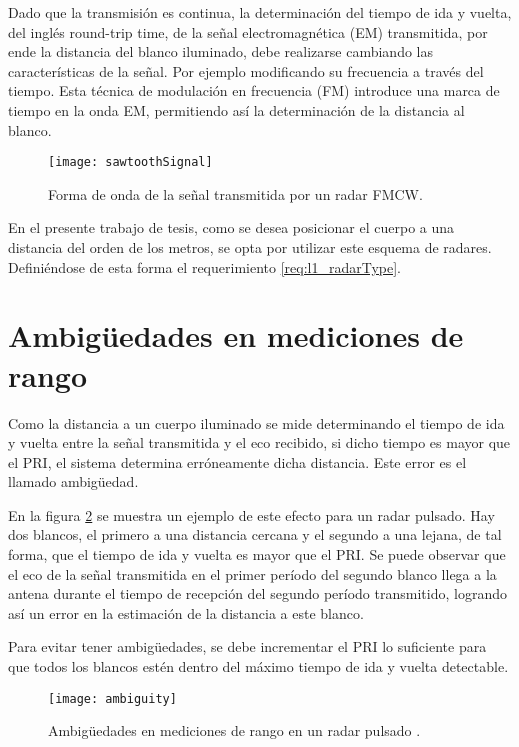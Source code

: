 Dado que la transmisión es continua, la determinación del tiempo de ida y vuelta, del inglés round-trip time, de la señal electromagnética (EM) transmitida, por ende la distancia del blanco iluminado, debe realizarse cambiando las características de la señal. Por ejemplo modificando su frecuencia a través del tiempo. Esta técnica de modulación en frecuencia (FM) introduce una marca de tiempo en la onda EM, permitiendo así la determinación de la distancia al blanco.

\begin{figure}[H]
 \centering
 \texttt{[image: sawtoothSignal]}
 \caption{Forma de onda de la señal transmitida por un radar FMCW.}
 \label{fig:continuousWaveform}
\end{figure}

En el presente trabajo de tesis, como se desea posicionar el cuerpo a una distancia del orden de los metros, se opta por utilizar este esquema de radares. Definiéndose de esta forma el requerimiento \ref{req:l1_radarType}.


\section{Ambigüedades en mediciones de rango} \label{sc:ambiguity}

Como la distancia a un cuerpo iluminado se mide determinando el tiempo de ida y vuelta entre la señal transmitida y el eco recibido, si dicho tiempo es mayor que el PRI, el sistema determina erróneamente dicha distancia. Este error es el llamado ambigüedad.

En la figura \ref{fig:ambiguity} se muestra un ejemplo de este efecto para un radar pulsado. Hay dos blancos, el primero a una distancia cercana y el segundo a una lejana, de tal forma, que el tiempo de ida y vuelta es mayor que el PRI. Se puede observar que el eco de la señal transmitida en el primer período del segundo blanco llega a la antena durante el tiempo de recepción del segundo período transmitido, logrando así un error en la estimación de la distancia a este blanco.

Para evitar tener ambigüedades, se debe incrementar el PRI lo suficiente para que todos los blancos estén dentro del máximo tiempo de ida y vuelta detectable.

\begin{figure}[H]
 \centering
 \texttt{[image: ambiguity]}
 \caption{Ambigüedades en mediciones de rango en un radar pulsado \cite{Richards2010}.}
 \label{fig:ambiguity}
\end{figure}


